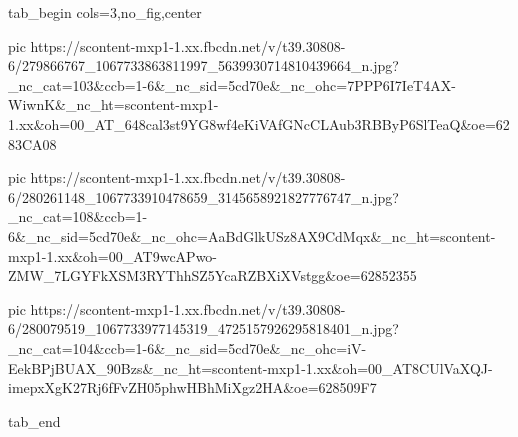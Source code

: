  
 
 
 
 

\ifcmt
  tab_begin cols=3,no_fig,center

     pic https://scontent-mxp1-1.xx.fbcdn.net/v/t39.30808-6/279866767_1067733863811997_5639930714810439664_n.jpg?_nc_cat=103&ccb=1-6&_nc_sid=5cd70e&_nc_ohc=7PPP6I7IeT4AX-WiwnK&_nc_ht=scontent-mxp1-1.xx&oh=00_AT_648cal3st9YG8wf4eKiVAfGNcCLAub3RBByP6SlTeaQ&oe=6283CA08
     
     pic https://scontent-mxp1-1.xx.fbcdn.net/v/t39.30808-6/280261148_1067733910478659_3145658921827776747_n.jpg?_nc_cat=108&ccb=1-6&_nc_sid=5cd70e&_nc_ohc=AaBdGlkUSz8AX9CdMqx&_nc_ht=scontent-mxp1-1.xx&oh=00_AT9wcAPwo-ZMW_7LGYFkXSM3RYThhSZ5YcaRZBXiXVstgg&oe=62852355

     pic https://scontent-mxp1-1.xx.fbcdn.net/v/t39.30808-6/280079519_1067733977145319_4725157926295818401_n.jpg?_nc_cat=104&ccb=1-6&_nc_sid=5cd70e&_nc_ohc=iV-EekBPjBUAX_90Bzs&_nc_ht=scontent-mxp1-1.xx&oh=00_AT8CUlVaXQJ-imepxXgK27Rj6fFvZH05phwHBhMiXgz2HA&oe=628509F7

  tab_end
\fi
